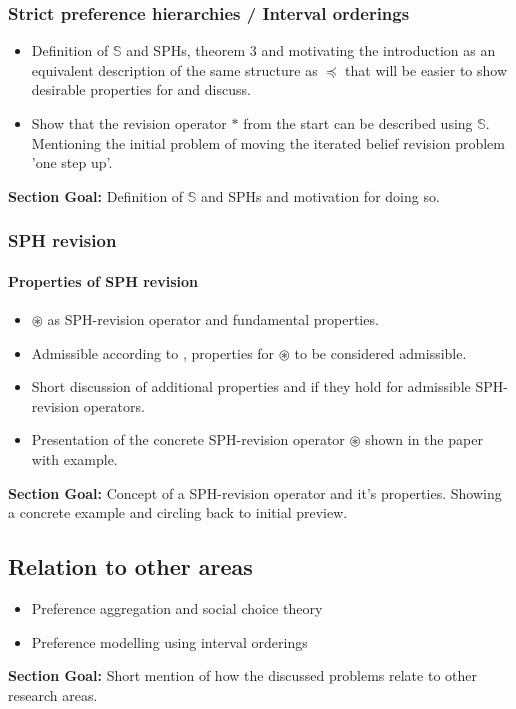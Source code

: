 \documentclass[11pt]{article}
\begin{document}
\subsubsection{Strict preference hierarchies / Interval orderings}
\begin{itemize}
    \item Definition of $\mathds{S}$ and SPHs, theorem 3 and motivating the introduction as an equivalent description of the same structure as $\preceq$ that will be easier to show desirable properties for and discuss.
    \item Show that the revision operator $\ast$ from the start can be described using $\mathds{S}$. Mentioning the initial problem of moving the iterated belief revision problem 'one step up'.
\end{itemize}
\textbf{Section Goal:} Definition of $\mathds{S}$ and SPHs and motivation for doing so.

\subsubsection{SPH revision}
\paragraph{Properties of SPH revision}
\begin{itemize}
    \item $\circledast$ as SPH-revision operator and fundamental properties.
    \item Admissible according to \cite{Booth2006a}, properties for $\circledast$ to be considered admissible.
    \item Short discussion of additional properties and if they hold for admissible SPH-revision operators.
    \item Presentation of the concrete SPH-revision operator $\circledast$ shown in the paper with example.
\end{itemize}
\textbf{Section Goal:} Concept of a SPH-revision operator and it's properties. Showing a concrete example and circling back to initial preview.

\subsection{Relation to other areas}
\begin{itemize}
    \item Preference aggregation and social choice theory
    \item Preference modelling using interval orderings
\end{itemize}
\textbf{Section Goal:} Short mention of how the discussed problems relate to other research areas.
\end{document}
